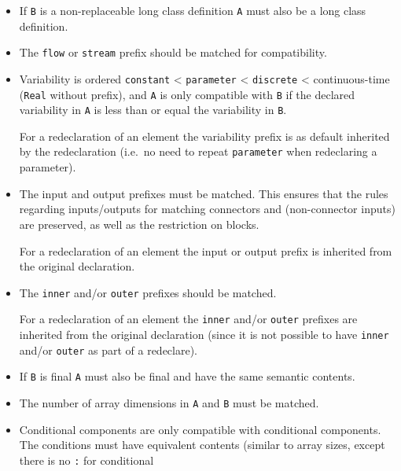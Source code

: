 \begin{itemize}
  \begin{itemize}
  \item
    If \lstinline!B! is a non-replaceable long class definition \lstinline!A! must also be a
    long class definition.
  \item
    The \lstinline!flow! or \lstinline!stream! prefix should be matched for compatibility.
  \item
    Variability is ordered \lstinline!constant! \textless{} \lstinline!parameter! \textless{}
    \lstinline!discrete! \textless{} continuous-time (\lstinline!Real! without prefix), and \lstinline!A! is
    only compatible with \lstinline!B! if the declared variability in \lstinline!A! is less than
    or equal the variability in \lstinline!B!.
    \begin{nonnormative}
    For a redeclaration of an element the variability prefix is as default inherited by the redeclaration (i.e.\ no need to repeat \lstinline!parameter!
    when redeclaring a parameter).
    \end{nonnormative}
  \item
    The input and output prefixes must be matched. This ensures that the
    rules regarding inputs/outputs for matching connectors and
    (non-connector inputs) are preserved, as well as the restriction on
    blocks.
    \begin{nonnormative}
    For a redeclaration of an element the input or output prefix is inherited from the original declaration.
    \end{nonnormative}
  \item
    The \lstinline!inner! and/or \lstinline!outer! prefixes should be matched.
    \begin{nonnormative}
    For a redeclaration of an element the \lstinline!inner! and/or \lstinline!outer! prefixes are inherited from the original declaration (since it is not
    possible to have \lstinline!inner! and/or \lstinline!outer! as part of a redeclare).
    \end{nonnormative}
  \item
    If \lstinline!B! is final \lstinline!A! must also be final and have the same semantic
    contents.
  \item
    The number of array dimensions in \lstinline!A! and \lstinline!B! must be matched.
  \item
    Conditional components are only compatible with conditional components.  The conditions must have equivalent contents (similar to array sizes, except there is no \lstinline!:! for conditional

\end{itemize}
\end{itemize}
